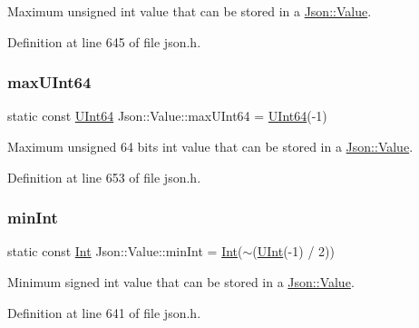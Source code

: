 Maximum unsigned int value that can be stored in a \hyperlink{class_json_1_1_value}{Json\+::\+Value}. 



Definition at line 645 of file json.\+h.

\hypertarget{class_json_1_1_value_a069dd34617e27dd9922ced3a0160280d}{}\label{class_json_1_1_value_a069dd34617e27dd9922ced3a0160280d} 
\subsubsection{\texorpdfstring{max\+U\+Int64}{maxUInt64}}
{\footnotesize\ttfamily static const \hyperlink{class_json_1_1_value_a8b62564be8c087c6d18de180ff4e13e3}{U\+Int64} Json\+::\+Value\+::max\+U\+Int64 = \hyperlink{class_json_1_1_value_a8b62564be8c087c6d18de180ff4e13e3}{U\+Int64}(-\/1)\hspace{0.3cm}{\ttfamily [static]}}



Maximum unsigned 64 bits int value that can be stored in a \hyperlink{class_json_1_1_value}{Json\+::\+Value}. 



Definition at line 653 of file json.\+h.

\hypertarget{class_json_1_1_value_ad062d227e00408ce594026959d6ed2e1}{}\label{class_json_1_1_value_ad062d227e00408ce594026959d6ed2e1} 
\subsubsection{\texorpdfstring{min\+Int}{minInt}}
{\footnotesize\ttfamily static const \hyperlink{class_json_1_1_value_abdf7a7ff73eb130ffcab28504ffdb405}{Int} Json\+::\+Value\+::min\+Int = \hyperlink{class_json_1_1_value_abdf7a7ff73eb130ffcab28504ffdb405}{Int}($\sim$(\hyperlink{class_json_1_1_value_a0933d59b45793ae4aade1757c322a98d}{U\+Int}(-\/1) / 2))\hspace{0.3cm}{\ttfamily [static]}}



Minimum signed int value that can be stored in a \hyperlink{class_json_1_1_value}{Json\+::\+Value}. 



Definition at line 641 of file json.\+h.

